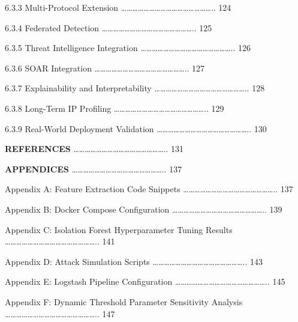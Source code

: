\documentclass[
  a4paper]{report}
\begin{document}
6.3.3 Multi-Protocol Extension
\ldots\ldots\ldots\ldots\ldots\ldots\ldots\ldots\ldots\ldots\ldots\ldots\ldots\ldots\ldots\ldots..
124

6.3.4 Federated Detection
\ldots\ldots\ldots\ldots\ldots\ldots\ldots\ldots\ldots\ldots\ldots\ldots\ldots\ldots\ldots\ldots..
125

6.3.5 Threat Intelligence Integration
\ldots\ldots\ldots\ldots\ldots\ldots\ldots\ldots\ldots\ldots\ldots\ldots\ldots\ldots\ldots\ldots..
126

6.3.6 SOAR Integration
\ldots\ldots\ldots\ldots\ldots\ldots\ldots\ldots\ldots\ldots\ldots\ldots\ldots\ldots\ldots\ldots..
127

6.3.7 Explainability and Interpretability
\ldots\ldots\ldots\ldots\ldots\ldots\ldots\ldots\ldots\ldots\ldots\ldots\ldots\ldots\ldots\ldots..
128

6.3.8 Long-Term IP Profiling
\ldots\ldots\ldots\ldots\ldots\ldots\ldots\ldots\ldots\ldots\ldots\ldots\ldots\ldots\ldots\ldots..
129

6.3.9 Real-World Deployment Validation
\ldots\ldots\ldots\ldots\ldots\ldots\ldots\ldots\ldots\ldots\ldots\ldots\ldots\ldots\ldots\ldots..
130

\textbf{REFERENCES}
\ldots\ldots\ldots\ldots\ldots\ldots\ldots\ldots\ldots\ldots\ldots\ldots\ldots\ldots\ldots\ldots..
131

\textbf{APPENDICES}
\ldots\ldots\ldots\ldots\ldots\ldots\ldots\ldots\ldots\ldots\ldots\ldots\ldots\ldots\ldots\ldots..
137

Appendix A: Feature Extraction Code Snippets
\ldots\ldots\ldots\ldots\ldots\ldots\ldots\ldots\ldots\ldots\ldots\ldots\ldots\ldots\ldots\ldots..
137

Appendix B: Docker Compose Configuration
\ldots\ldots\ldots\ldots\ldots\ldots\ldots\ldots\ldots\ldots\ldots\ldots\ldots\ldots\ldots\ldots..
139

Appendix C: Isolation Forest Hyperparameter Tuning Results
\ldots\ldots\ldots\ldots\ldots\ldots\ldots\ldots\ldots\ldots\ldots\ldots\ldots\ldots\ldots\ldots..
141

Appendix D: Attack Simulation Scripts
\ldots\ldots\ldots\ldots\ldots\ldots\ldots\ldots\ldots\ldots\ldots\ldots\ldots\ldots\ldots\ldots..
143

Appendix E: Logstash Pipeline Configuration
\ldots\ldots\ldots\ldots\ldots\ldots\ldots\ldots\ldots\ldots\ldots\ldots\ldots\ldots\ldots\ldots..
145

Appendix F: Dynamic Threshold Parameter Sensitivity Analysis
\ldots\ldots\ldots\ldots\ldots\ldots\ldots\ldots\ldots\ldots\ldots\ldots\ldots\ldots\ldots\ldots..
147
\end{document}
